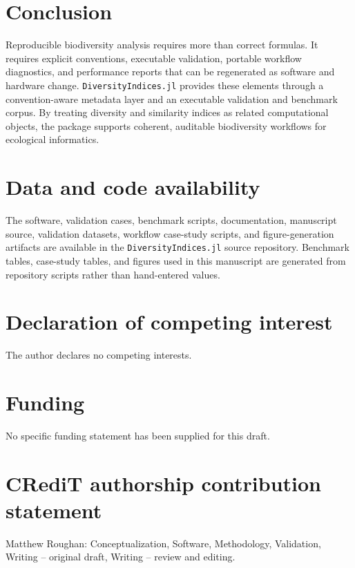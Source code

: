 \documentclass[preprint,12pt,authoryear]{elsarticle}
\begin{document}
\section{Conclusion}

Reproducible biodiversity analysis requires more than correct formulas.
It requires explicit conventions, executable validation, portable workflow
diagnostics, and performance reports that can be regenerated as software and
hardware change.  \texttt{DiversityIndices.jl} provides these elements through
a convention-aware metadata layer and an executable validation and benchmark
corpus.  By treating diversity and similarity indices as related computational
objects, the package supports coherent, auditable biodiversity workflows for
ecological informatics.

\section*{Data and code availability}

The software, validation cases, benchmark scripts, documentation, manuscript
source, validation datasets, workflow case-study scripts, and
figure-generation artifacts are available in the \texttt{DiversityIndices.jl}
source repository.  Benchmark tables, case-study tables, and figures used in
this manuscript are generated from repository scripts rather than hand-entered
values.

\section*{Declaration of competing interest}

The author declares no competing interests.

\section*{Funding}

No specific funding statement has been supplied for this draft.

\section*{CRediT authorship contribution statement}

Matthew Roughan: Conceptualization, Software, Methodology, Validation,
Writing -- original draft, Writing -- review and editing.



\end{document}
